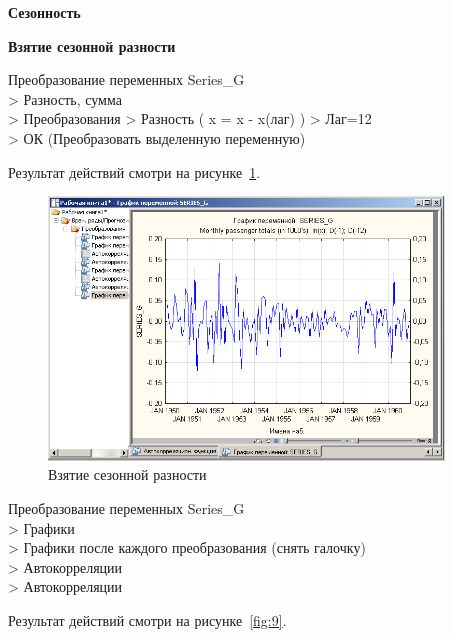 
\newpage

\begin{center}
  \textbf{Сезонность}
\end{center}

\begin{center}
  \textbf{Взятие сезонной разности}
\end{center}

Преобразование переменных Series\_G\\
> Разность, сумма\\
> Преобразования  > Разность ( x = x - x(лаг) ) > Лаг=12\\
> ОК (Преобразовать выделенную переменную)

Результат действий смотри на рисунке~\ref{fig:8}.

\begin{figure}[!h]
  \centering

  \includegraphics[height=7cm]
  {inc/Series_G/8.PNG}

  \caption{Взятие сезонной разности}

  \label{fig:8}
\end{figure}

Преобразование переменных Series\_G\\
> Графики\\
> Графики после каждого преобразования (снять галочку)\\
> Автокорреляции\\
> Автокорреляции

Результат действий смотри на рисунке~\ref{fig:9}.

